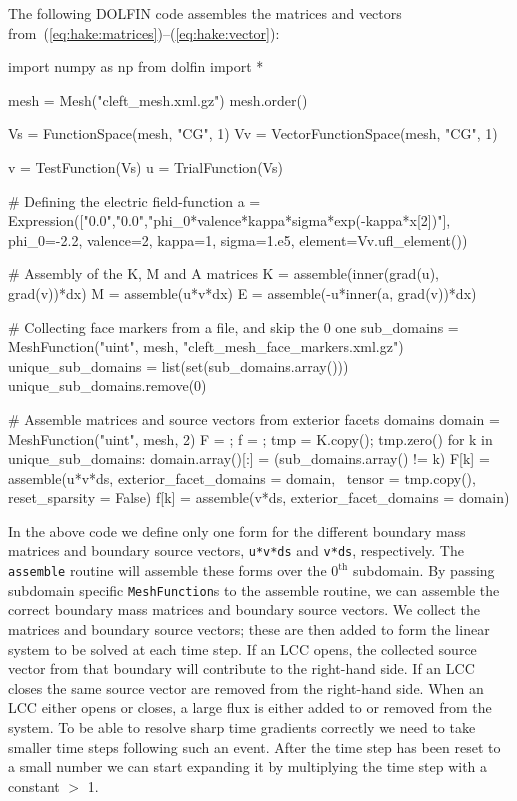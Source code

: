The following DOLFIN code assembles the matrices and vectors
from~(\ref{eq:hake:matrices})--(\ref{eq:hake:vector}):
\begin{python}
import numpy as np
from dolfin import *

mesh = Mesh("cleft_mesh.xml.gz")
mesh.order()

Vs = FunctionSpace(mesh, "CG", 1)
Vv = VectorFunctionSpace(mesh, "CG", 1)

v = TestFunction(Vs)
u = TrialFunction(Vs)

# Defining the electric field-function
a = Expression(["0.0","0.0","phi_0*valence*kappa*sigma*exp(-kappa*x[2])"],
               phi_0=-2.2, valence=2, kappa=1, sigma=1.e5,
               element=Vv.ufl_element())

# Assembly of the K, M and A matrices
K = assemble(inner(grad(u), grad(v))*dx)
M = assemble(u*v*dx)
E = assemble(-u*inner(a, grad(v))*dx)

# Collecting face markers from a file, and skip the 0 one
sub_domains = MeshFunction("uint", mesh, "cleft_mesh_face_markers.xml.gz")
unique_sub_domains = list(set(sub_domains.array()))
unique_sub_domains.remove(0)

# Assemble matrices and source vectors from exterior facets domains
domain = MeshFunction("uint", mesh, 2)
F = {}; f = {}; tmp = K.copy(); tmp.zero()
for k in unique_sub_domains:
    domain.array()[:] = (sub_domains.array() != k)
    F[k] = assemble(u*v*ds, exterior_facet_domains = domain, \
                    tensor = tmp.copy(), reset_sparsity = False)
    f[k] = assemble(v*ds, exterior_facet_domains = domain)
\end{python}
In the above code we define only one form for the different boundary
mass matrices and boundary source vectors, \texttt{u*v*ds} and
\texttt{v*ds}, respectively. The \texttt{assemble} routine will
assemble these forms over the $0^{\scriptscriptstyle\text{th}}$
subdomain. By passing subdomain specific \texttt{MeshFunction}s to
the assemble routine, we can assemble the correct boundary mass
matrices and boundary source vectors. We collect the matrices and
boundary source vectors; these are then added to form the linear
system to be solved at each time step. If an LCC opens, the collected
source vector from that boundary will contribute to the right-hand
side. If an LCC closes the same source vector are removed from the
right-hand side. When an LCC either opens or closes, a large flux is
either added to or removed from the system. To be able to resolve
sharp time gradients correctly we need to take smaller time steps
following such an event. After the time step has been reset to a small
number we can start expanding it by multiplying the time step with a
constant $>$ 1.

